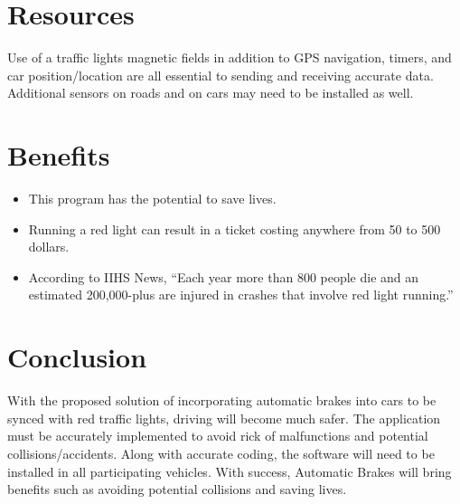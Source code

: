 \documentclass[12pt]{article}
\begin{document}
\section{Resources}
Use of a traffic lights magnetic fields in addition to GPS navigation, timers, and car position/location are all essential to sending and receiving accurate data. Additional sensors on roads and on cars may need to be installed as well.
\section{Benefits}
\begin{itemize}
	\item This program has the potential to save lives.
	\item Running a red light can result in a ticket costing anywhere from 50 to 500 dollars.~\cite{redlight2010software}
	\item According to IIHS News, “Each year more than 800 people die and an estimated 200,000-plus are injured in crashes that involve red light running.”~\cite{800deaths2000software}
\end{itemize}
\section{Conclusion}
With the proposed solution of incorporating automatic brakes into cars to be synced with red traffic lights, driving will become much safer. The application must be accurately implemented to avoid rick of malfunctions and potential collisions/accidents. Along with accurate coding, the software will need to be installed in all participating vehicles. With success, Automatic Brakes will bring benefits such as avoiding potential collisions and saving lives.




\end{document}
